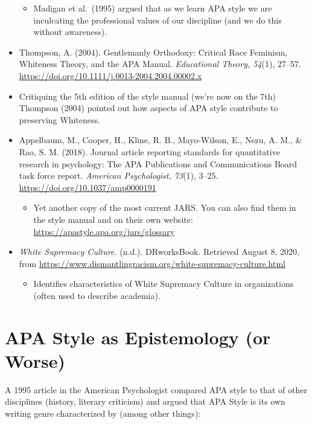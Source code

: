 \documentclass[
  english,
]{book}
\providecommand{\tightlist}{%
  \setlength{\itemsep}{0pt}\setlength{\parskip}{0pt}}
\begin{document}
\begin{itemize}
  \begin{itemize}
  \tightlist
  \item
    Madigan et al.~(1995) argued that as we learn APA style we are inculcating the professional values of our discipline (and we do this without awareness).
  \end{itemize}
\item
  Thompson, A. (2004). Gentlemanly Orthodoxy: Critical Race Feminism, Whiteness Theory, and the APA Manual. \emph{Educational Theory, 54}(1), 27--57. \url{https://doi.org/10.1111/j.0013-2004.2004.00002.x}
\item
  Critiquing the 5th edition of the style manual (we're now on the 7th) Thompson (2004) pointed out how aspects of APA style contribute to preserving Whiteness.
\item
  Appelbaum, M., Cooper, H., Kline, R. B., Mayo-Wilson, E., Nezu, A. M., \& Rao, S. M. (2018). Journal article reporting standards for quantitative research in psychology: The APA Publications and Communications Board task force report. \emph{American Psychologist, 73}(1), 3--25. \url{https://doi.org/10.1037/amp0000191}

  \begin{itemize}
  \tightlist
  \item
    Yet another copy of the most current JARS. You can also find them in the style manual and on their own website: \url{https://apastyle.apa.org/jars/glossary}
  \end{itemize}
\item
  \emph{White Supremacy Culture.} (n.d.). DRworksBook. Retrieved August 8, 2020, from \url{https://www.dismantlingracism.org/white-supremacy-culture.html}

  \begin{itemize}
  \tightlist
  \item
    Identifies characteristics of White Supremacy Culture in organizations (often used to describe academia).
  \end{itemize}
\end{itemize}

\hypertarget{apa-style-as-epistemology-or-worse}{%
\section{APA Style as Epistemology (or Worse)}\label{apa-style-as-epistemology-or-worse}}

A 1995 article \citep{madigan_language_1995} in the American Psychologist compared APA style to that of other disciplines (history, literary criticism) and argued that APA Style is its own writing genre characterized by (among other things):
\end{document}
